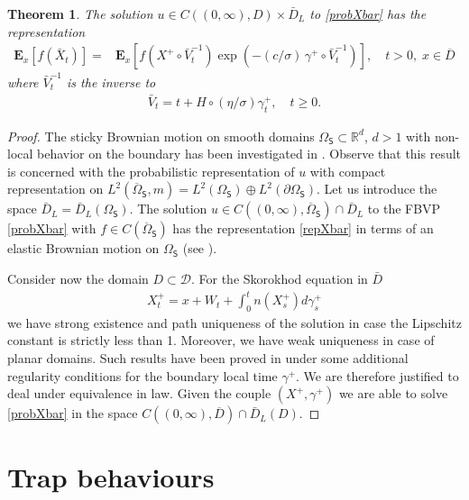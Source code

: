 \documentclass[[11pt,a4paper,reqno]{article}
\newtheorem{theorem}{Theorem}[section]
\numberwithin{equation}{section}
\begin{document}
\begin{theorem}
The solution $u \in C((0, \infty), D) \times \bar{D}_L$ to \eqref{probXbar} has the representation
\begin{align}
\mathbf{E}_x\left[ f(\bar{X}_t) \right] = & \mathbf{E}_x\left[f(X^+ \circ \bar{V}^{-1}_t) \exp \left( - (c/\sigma)\, \gamma^+ \circ \bar{V}^{-1}_t \right) \right], \quad t>0,\; x \in \overline{D}
\label{repXbar}
\end{align}
where $\bar{V}^{-1}_t$ is the inverse to 
\begin{align}
\bar{V}_t = t + H \circ (\eta/\sigma) \gamma^+_t, \quad t\geq 0.
\end{align} 
\end{theorem}
\begin{proof}
The sticky Brownian motion on smooth domains $\Omega_\mathsf{S} \subset \mathbb{R}^d$, $d > 1$ with non-local behavior on the boundary has been investigated in \cite{DovSticky2}. Observe that this result is concerned with the probabilistic representation of $u$ with compact representation on $L^2(\overline{\Omega}_\mathsf{S},m) = L^2(\Omega_\mathsf{S}) \oplus L^2(\partial \Omega_\mathsf{S})$. Let us introduce the space $\bar{D}_L=\bar{D}_L(\Omega_\mathsf{S})$. The solution $u \in C((0, \infty), \overline{\Omega}_\mathsf{S}) \cap \bar{D}_L$ to the FBVP \eqref{probXbar} with $f \in C(\overline{\Omega}_\mathsf{S})$ has the representation \eqref{repXbar} in terms of an elastic Brownian motion on $\Omega_\mathsf{S}$ (see \cite{DovSticky2}).


Consider now the domain $D \subset \mathcal{D}$. For the Skorokhod equation in $\bar{D}$
\begin{align*}
X^+_t = x + W_t + \int_0^t n(X^+_s) d\gamma^+_s
\end{align*}
we have strong existence and path uniqueness of the solution in case the Lipschitz constant is strictly less than 1. Moreover, we have weak uniqueness in case of planar domains. Such results have been proved in \cite{BBC05} under some additional regularity conditions for the boundary local time $\gamma^+$. We are therefore justified to deal under equivalence in law. Given the couple $(X^+, \gamma^+)$ we are able to solve \eqref{probXbar} in the space $C((0, \infty), \overline{D}) \cap \bar{D}_L(D)$.
\end{proof}




\section{Trap behaviours}
\end{document}

